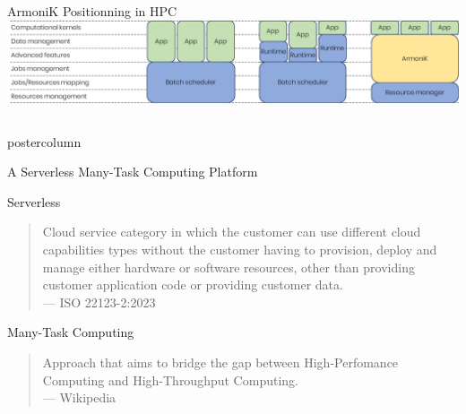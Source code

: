 \begin{frame}[fragile]
    \begin{block}{ArmoniK Positionning in HPC}
    \centering
    \includegraphics[width=.9\textwidth]{hpc-orchestrators.png}            
    \end{block}
  \begin{columns}
    \begin{column}{.49\textwidth}
      \begin{beamercolorbox}[center,wd=\textwidth]{postercolumn}
        \begin{minipage}[T]{.95\textwidth}
          \parbox[t][\columnheight]{\textwidth}{
            
            \begin{block}{A Serverless Many-Task Computing Platform}
                \begin{alertblock}{Serverless}
                \begin{quote}
                    Cloud service category in which the customer can use different cloud capabilities types
                    without the customer having to provision, deploy and manage either hardware or software
                    resources, other than providing customer application code or providing customer data.
                    \\
                    --- ISO 22123-2:2023
                \end{quote}
                \end{alertblock}
                \begin{alertblock}{Many-Task Computing}
                \begin{quote}
                    Approach that aims to bridge the gap between High-Perfomance Computing and High-Throughput Computing.
                    \\
                    --- Wikipedia
                \end{quote}
                \end{alertblock}         
            \end{block}
            

}
\end{minipage}
\end{beamercolorbox}
\end{column}
\end{columns}
\end{frame}
